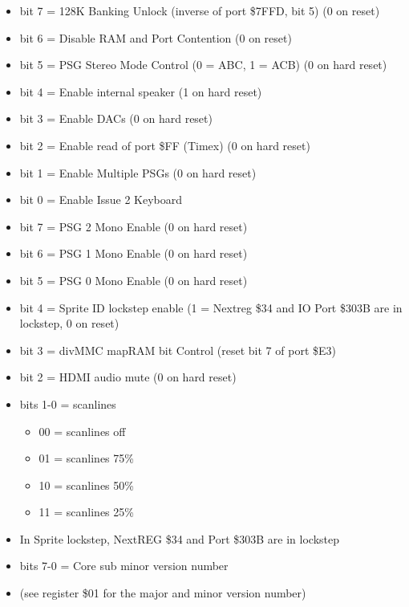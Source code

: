 \begin{itemize}
\item bit 7 = 128K Banking Unlock (inverse of port \$7FFD, bit 5) (0
  on reset)
\item bit 6 = Disable RAM and Port Contention (0 on reset)
\item bit 5 = PSG Stereo Mode Control (0 = ABC, 1 = ACB) (0 on hard
  reset)
\item bit 4 = Enable internal speaker (1 on hard reset)
\item bit 3 = Enable DACs (0 on hard reset)
\item bit 2 = Enable read of port \$FF (Timex) (0 on hard reset)
\item bit 1 = Enable Multiple PSGs (0 on hard reset)
\item bit 0 = Enable Issue 2 Keyboard
\end{itemize}

\begin{itemize}
\item bit 7 = PSG 2 Mono Enable (0 on hard reset)
\item bit 6 = PSG 1 Mono Enable (0 on hard reset)
\item bit 5 = PSG 0 Mono Enable (0 on hard reset)
\item bit 4 = Sprite ID lockstep enable (1 = Nextreg \$34 and IO Port
  \$303B are in lockstep, 0 on reset)
\item bit 3 = divMMC mapRAM bit Control (reset bit 7 of port \$E3)
\item bit 2 = HDMI audio mute (0 on hard reset)
\item bits 1-0 = scanlines
  \begin{itemize}
  \item 00 = scanlines off
  \item 01 = scanlines 75\%
  \item 10 = scanlines 50\%
  \item 11 = scanlines 25\%
  \end{itemize}
\item[] In Sprite lockstep, NextREG \$34 and Port \$303B are in
  lockstep
\end{itemize}

\begin{itemize}
\item bits 7-0 = Core sub minor version number
\item[] (see register \$01 for the major and minor version number)
\end{itemize}

